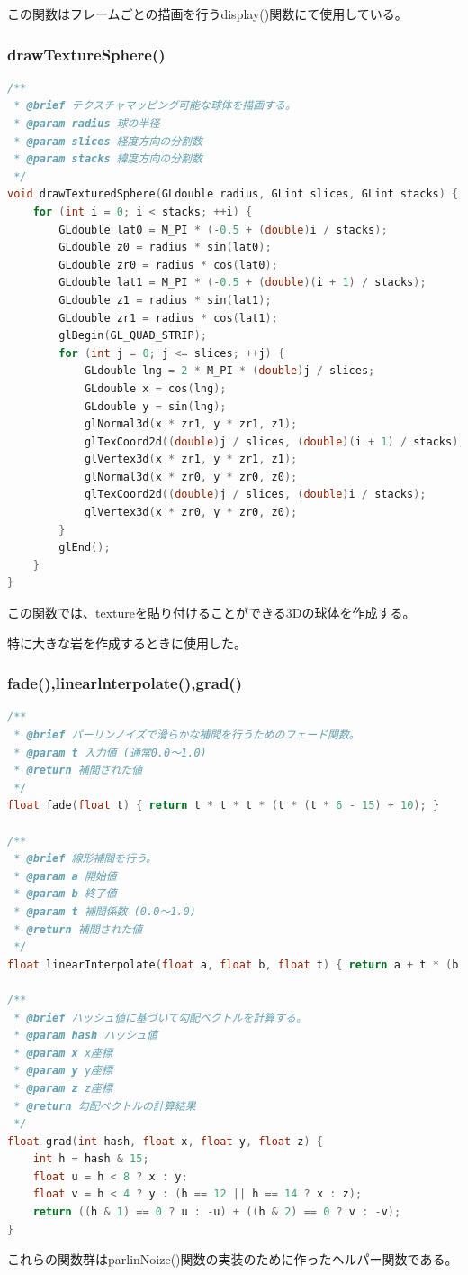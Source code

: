\documentclass[upIatex,dvipdfmx,a4paper]{jsarticle}
\begin{document}
この関数はフレームごとの描画を行うdisplay()関数にて使用している。
\subsubsection{drawTextureSphere()}
\begin{lstlisting}[language=C++, caption={drawTexturedSphere() 関数}, label={lst:drawTexturedSphere}]
/**
 * @brief テクスチャマッピング可能な球体を描画する。
 * @param radius 球の半径
 * @param slices 経度方向の分割数
 * @param stacks 緯度方向の分割数
 */
void drawTexturedSphere(GLdouble radius, GLint slices, GLint stacks) {
    for (int i = 0; i < stacks; ++i) {
        GLdouble lat0 = M_PI * (-0.5 + (double)i / stacks);
        GLdouble z0 = radius * sin(lat0);
        GLdouble zr0 = radius * cos(lat0);
        GLdouble lat1 = M_PI * (-0.5 + (double)(i + 1) / stacks);
        GLdouble z1 = radius * sin(lat1);
        GLdouble zr1 = radius * cos(lat1);
        glBegin(GL_QUAD_STRIP);
        for (int j = 0; j <= slices; ++j) {
            GLdouble lng = 2 * M_PI * (double)j / slices;
            GLdouble x = cos(lng);
            GLdouble y = sin(lng);
            glNormal3d(x * zr1, y * zr1, z1);
            glTexCoord2d((double)j / slices, (double)(i + 1) / stacks);
            glVertex3d(x * zr1, y * zr1, z1);
            glNormal3d(x * zr0, y * zr0, z0);
            glTexCoord2d((double)j / slices, (double)i / stacks);
            glVertex3d(x * zr0, y * zr0, z0);
        }
        glEnd();
    }
}
\end{lstlisting}

この関数では、textureを貼り付けることができる3Dの球体を作成する。

特に大きな岩を作成するときに使用した。

\subsubsection{fade(),linearlnterpolate(),grad()}
\begin{lstlisting}[language=C++, caption={パーリンノイズ用ヘルパー関数}, label={lst:perlin_helpers}]
/**
 * @brief パーリンノイズで滑らかな補間を行うためのフェード関数。
 * @param t 入力値 (通常0.0～1.0)
 * @return 補間された値
 */
float fade(float t) { return t * t * t * (t * (t * 6 - 15) + 10); }

/**
 * @brief 線形補間を行う。
 * @param a 開始値
 * @param b 終了値
 * @param t 補間係数 (0.0～1.0)
 * @return 補間された値
 */
float linearInterpolate(float a, float b, float t) { return a + t * (b - a); }

/**
 * @brief ハッシュ値に基づいて勾配ベクトルを計算する。
 * @param hash ハッシュ値
 * @param x x座標
 * @param y y座標
 * @param z z座標
 * @return 勾配ベクトルの計算結果
 */
float grad(int hash, float x, float y, float z) {
    int h = hash & 15;
    float u = h < 8 ? x : y;
    float v = h < 4 ? y : (h == 12 || h == 14 ? x : z);
    return ((h & 1) == 0 ? u : -u) + ((h & 2) == 0 ? v : -v);
}
\end{lstlisting}
これらの関数群はparlinNoize()関数の実装のために作ったヘルパー関数である。
\end{document}
